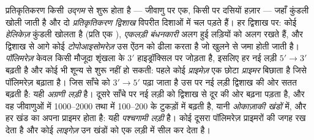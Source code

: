 \begin{definition}\label{def:b1:replication-mitosis:fork}
प्रतिकृतिकरण किसी \emph{उद्गम} से शुरू होता है --- जीवाणु  पर
एक, किसी   पर दसियों हज़ार --- जहाँ कुंडली खोली जाती है
और दो \emph{प्रतिकृतिकरण द्विशाख} विपरीत दिशाओं में चल पड़ते हैं। हर
द्विशाख पर: कोई \emph{हेलिकेज़} कुंडली खोलता है (प्रति  एक
), \emph{एकलड़ी बंधनकारी } अलग हुई लड़ियों को अलग रखते हैं, और
द्विशाख से आगे कोई \emph{टोपोआइसोमरेज़} उस ऐंठन को ढीला करता है जो खुलने
से जमा होती जाती है। \emph{ पॉलिमरेज़}  केवल किसी
मौजूदा शृंखला के $3'$ हाइड्रॉक्सिल पर जोड़ता है, इसलिए हर नई लड़ी
$5' \to 3'$ बढ़ती है और कोई भी शून्य से शुरू नहीं हो सकती: पहले कोई
\emph{प्राइमेज़} एक छोटा  \emph{प्राइमर} बिछाता है जिसे पॉलिमरेज़
बढ़ाता है। जिस साँचे को $3' \to 5'$ पढ़ा जाता है उस पर नई लड़ी द्विशाख
की ओर सतत बढ़ती है: यही \emph{अग्रणी लड़ी} है।
दूसरे साँचे पर नई लड़ी को द्विशाख से दूर की ओर बढ़ना पड़ता है, और वह
जीवाणुओं में \qtyrange{1000}{2000}{} तथा  में
\qtyrange{100}{200}{}  के टुकड़ों में बढ़ती है, यानी
\emph{ओकाज़ाकी खंडों} में, और हर खंड का अपना प्राइमर होता है: यही
\emph{पश्चगामी लड़ी} है। कोई दूसरा पॉलिमरेज़ प्राइमरों की जगह  रख देता
है और कोई \emph{लाइगेज़} उन खंडों को एक लड़ी में सील कर देता है।
\end{definition}

